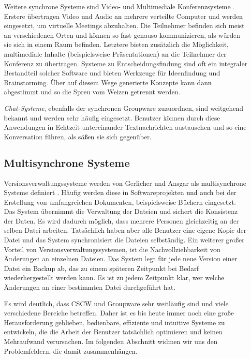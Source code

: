 Weitere synchrone Systeme sind Video- und Multimediale Konferenzsysteme \citep{Gerlicher:2007p241}. Erstere übertragen Video und Audio an mehrere verteilte Computer und werden eingesetzt, um virtuelle Meetings abzuhalten. Die Teilnehmer befinden sich meist an verschiedenen Orten und können so fast genauso kommunizieren, als würden sie sich in einem Raum befinden. Letztere bieten zusätzlich die Möglichkeit, multimediale Inhalte (beispielsweise Präsentationen) an die Teilnehmer der Konferenz zu übertragen. Systeme zu Entscheidungsfindung sind oft ein integraler Bestandteil solcher Software und bieten Werkzeuge für Ideenfindung und Brainstorming. Über auf diesem Wege generierte Konzepte kann dann abgestimmt und so die Spreu vom Weizen getrennt werden. 

\emph{Chat-Systeme}, ebenfalls der synchronen Groupware zuzuordnen, sind weitgehend bekannt und werden sehr häufig eingesetzt. Benutzer können durch diese Anwendungen in Echtzeit untereinander Textnachrichten austauschen und so eine Konversation führen, als säßen sie sich gegenüber. 

\subsection{Multisynchrone Systeme}

Versionsverwaltungssysteme werden von Gerlicher und Ansgar als multisynchrone Systeme definiert \citep{Gerlicher:2007p241}. Häufig werden diese in Softwareprojekten und auch bei der Erstellung von umfangreichen Dokumenten, beispielsweise Büchern eingesetzt. Das System übernimmt die Verwaltung der Dateien und sichert die Konsistenz der Daten. Es wird dadurch möglich, dass mehrere Personen gleichzeitig an der selben Datei arbeiten. Tatsächlich haben aber alle Benutzer eine eigene Kopie der Datei und das System synchronisiert die Dateien selbständig. Ein weiterer großer Vorteil von Versionsverwaltungssystemen, ist die Nachvollziehbarkeit von Änderungen \citep{Gerlicher:2007p241} an einzelnen Dateien. Das System legt für jede neue Version einer Datei ein Backup ab, das zu einem späteren Zeitpunkt bei Bedarf wiederhergestellt werden kann. Es ist zu jedem Zeitpunkt klar, wer welche Änderungen an einer bestimmten Datei durchgeführt hat. 

\bigskip Es wird deutlich, dass CSCW und Groupware sehr weitläufig sind und viele verschiedene Bereiche betreffen. Daher ist es bis heute immer noch eine große Herausforderung geblieben, bedienbare, effiziente und intuitive Systeme zu entwickeln, die die Arbeit der Benutzer tatsächlich optimieren und keinen Mehraufwand verursachen. Im folgenden Abschnitt widmen wir uns den Problemfeldern, die damit zusammenhängen.

